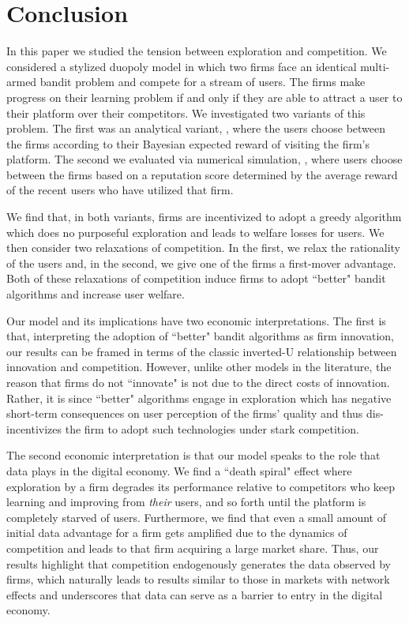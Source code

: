 \documentclass[../competing_bandits.tex]{subfiles}
\begin{document}
\section{Conclusion}\label{sec:conclusion}

In this paper we studied the tension between exploration and competition. We considered a stylized duopoly model in which two firms face an identical multi-armed bandit problem and compete for a stream of users. The firms make progress on their learning problem if and only if they are able to attract a user to their platform over their competitors. We investigated two variants of this problem. The first was an analytical variant, \TheoryModel, where the users choose between the firms according to their Bayesian expected reward of visiting the firm's platform. The second we evaluated via numerical simulation, \ExptsModel, where users choose between the firms based on a reputation score determined by the average reward of the recent users who have utilized that firm.


We find that, in both variants, firms are incentivized to adopt a greedy algorithm which does no purposeful exploration and leads to welfare losses for users. We then consider two relaxations of competition. In the first, we relax the rationality of the users and, in the second, we give one of the firms a first-mover advantage. Both of these relaxations of competition induce firms to adopt ``better" bandit algorithms and increase user welfare.


Our model and its implications have two economic interpretations. The first is that, interpreting the adoption of ``better" bandit algorithms as firm innovation, our results can be framed in terms of the classic inverted-U relationship between innovation and competition. However, unlike other models in the literature, the reason that firms do not ``innovate" is not due to the direct costs of innovation. Rather, it is since ``better" algorithms engage in exploration which has negative short-term consequences on user perception of the firms' quality and thus dis-incentivizes the firm to adopt such technologies under stark competition.


The second economic interpretation is that our model speaks to the role that data plays in the digital economy. We find a ``death spiral" effect where exploration by a firm degrades its performance relative to competitors who keep learning and improving from \emph{their} users, and so forth until the platform is completely starved of users. Furthermore, we find that even a small amount of initial data advantage for a firm gets amplified due to the dynamics of competition and leads to that firm acquiring a large market share. Thus, our results highlight that competition endogenously generates the data observed by firms, which naturally leads to results similar to those in markets with network effects and underscores that data can serve as a barrier to entry in the digital economy.
\end{document}
